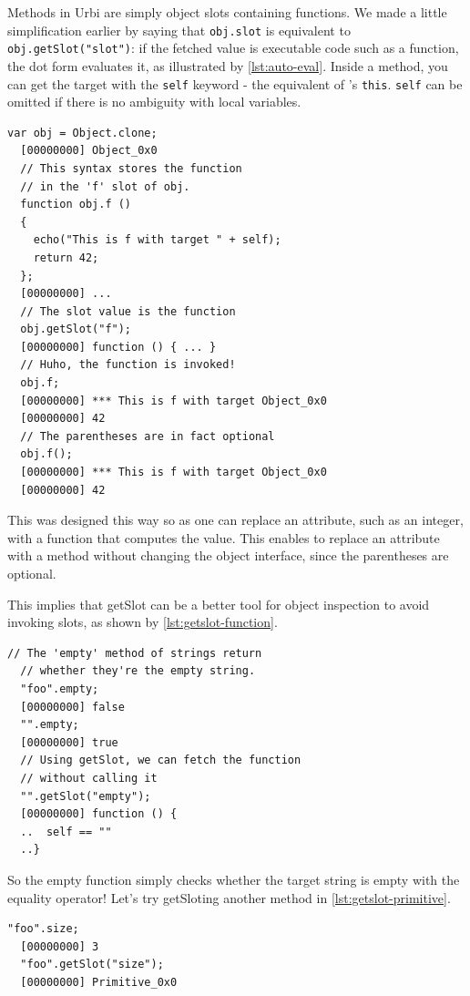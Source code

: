 \documentclass[openright,twoside,12pt]{report}
\newcommand{\urbi}{Urbi\xspace}
\newcommand{\lst}[1]{\autoref{lst:#1}}
\begin{document}
Methods in \urbi are simply object slots containing functions. We made
a little simplification earlier by saying that \lstinline|obj.slot| is
equivalent to \lstinline|obj.getSlot("slot")|: if the fetched value is
executable code such as a function, the dot form evaluates it, as
illustrated by \lst{auto-eval}. Inside a method, you can get the
target with the \lstinline|self| keyword - the equivalent of \Cxx's
\texttt{this}. \lstinline|self| can be omitted if there is no
ambiguity with local variables.

\begin{lstlisting}[caption=Function in object are automatically evaluated,
  label=lst:auto-eval]
  var obj = Object.clone;
  [00000000] Object_0x0
  // This syntax stores the function
  // in the 'f' slot of obj.
  function obj.f ()
  {
    echo("This is f with target " + self);
    return 42;
  };
  [00000000] ...
  // The slot value is the function
  obj.getSlot("f");
  [00000000] function () { ... }
  // Huho, the function is invoked!
  obj.f;
  [00000000] *** This is f with target Object_0x0
  [00000000] 42
  // The parentheses are in fact optional
  obj.f();
  [00000000] *** This is f with target Object_0x0
  [00000000] 42
\end{lstlisting}

This was designed this way so as one can replace an attribute, such as
an integer, with a function that computes the value. This enables to
replace an attribute with a method without changing the object
interface, since the parentheses are optional.

This implies that getSlot can be a better tool for object inspection
to avoid invoking slots, as shown by \lst{getslot-function}.

\begin{lstlisting}[caption=Inspecting executable slots with \texttt{getSlot},
  label=lst:getslot-function]
  // The 'empty' method of strings return
  // whether they're the empty string.
  "foo".empty;
  [00000000] false
  "".empty;
  [00000000] true
  // Using getSlot, we can fetch the function
  // without calling it
  "".getSlot("empty");
  [00000000] function () {
  ..  self == ""
  ..}
\end{lstlisting}

So the empty function simply checks whether the target string is empty
with the equality operator! Let's try getSloting another method in
\lst{getslot-primitive}.

\begin{lstlisting}[caption=Primitives, label=lst:getslot-primitive]
  "foo".size;
  [00000000] 3
  "foo".getSlot("size");
  [00000000] Primitive_0x0
\end{lstlisting}
\end{document}

